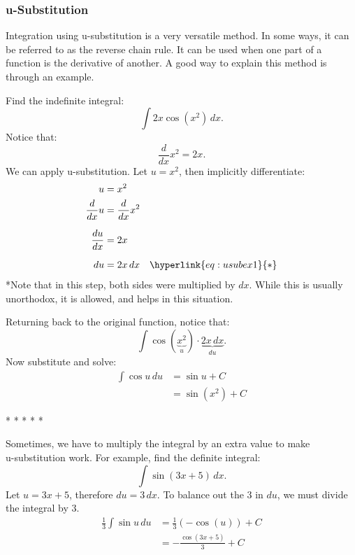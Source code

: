 \documentclass[12pt]{article}
\begin{document}
            \subsubsection{u-Substitution}
                Integration using u-substitution is a very versatile method. In some ways, it can be referred to as the reverse chain rule. It can be used when one part of a function is the derivative of another. A good way to explain this method is through an example.

                \noindent Find the indefinite integral:
                \[ \int 2x \cos(x^2) \, dx. \]
                \newline
                Notice that:
                \[ \frac{d}{dx} x^2 = 2x. \]
                We can apply u-substitution. Let $u = x^2$, then implicitly differentiate:
                \begin{align*}
                    u &= x^2 \\
                    \frac{d}{dx} u &= \frac{d}{dx} x^2 \\[6pt]
                    \frac{du}{dx} &= 2x \\[6pt]
                    du &= 2x \, dx \quad \hyperlink{eq:usubex1}{*}
                \end{align*}
                \hypertarget{eq:usubex1}{*}Note that in this step, both sides were multiplied by $dx$. While this is usually unorthodox, it is allowed, and helps in this situation.
                \bigskip

                \noindent Returning back to the original function, notice that:
                \[ \int \cos(\underbrace{x^2}_{u}) \cdot \underbrace{2x \, dx}_{du}. \]
                Now substitute and solve:
                \begin{align*}
                    \int \cos{u} \, du &= \sin{u} + C\\
                    &= \sin(x^2) + C
                \end{align*}
                \begin{center}
                    * * * * *
                \end{center}

                Sometimes, we have to multiply the integral by an extra value to make \\u-substitution work. For example, find the definite integral: %
                \[ \int \sin(3x+5) \, dx. \]
                Let $u = 3x+5$, therefore $du = 3 \, dx$. To balance out the $3$ in $du$, we must divide the integral by $3$.
                \begin{align*}
                    \frac{1}{3} \int \sin{u} \, du &= \frac{1}{3} \left( -\cos(u) \right) + C \\[6pt]
                    &= -\frac{\cos(3x+5)}{3} + C
                \end{align*}
\end{document}
